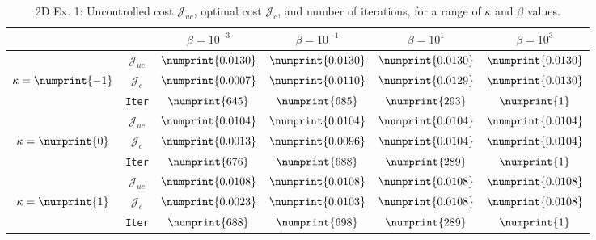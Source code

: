 \begin{table}
\begin{tabular}{ | c | c || c | c | c | c ||}
\hline
\multicolumn{2}{|c||}{}& $\beta = 10^{-3}$ & $\beta = 10^{-1}$ & $\beta = 10^{1}$ & $\beta = 10^{3}$  \\
\hline
\hline
 & $\mathcal{J}_{uc}$ & $\numprint{0.0130}$ & $\numprint{0.0130}$ & $\numprint{0.0130}$ & $\numprint{0.0130}$ \\
$\kappa= \numprint{-1}$  & $\mathcal{J}_c$ & $\numprint{0.0007}$ & $\numprint{0.0110}$ & $\numprint{0.0129}$ & $\numprint{0.0130}$ \\
& \texttt{Iter} & $\numprint{645}$ & $\numprint{685}$ & $\numprint{293}$ & $\numprint{1}$ \\
\hline
 & $\mathcal{J}_{uc}$ & $\numprint{0.0104}$ & $\numprint{0.0104}$ & $\numprint{0.0104}$ & $\numprint{0.0104}$ \\
$\kappa= \numprint{0}$  & $\mathcal{J}_c$ & $\numprint{0.0013}$ & $\numprint{0.0096}$ & $\numprint{0.0104}$ & $\numprint{0.0104}$ \\
& \texttt{Iter} & $\numprint{676}$ & $\numprint{688}$ & $\numprint{289}$ & $\numprint{1}$ \\
\hline
 & $\mathcal{J}_{uc}$ & $\numprint{0.0108}$ & $\numprint{0.0108}$ & $\numprint{0.0108}$ & $\numprint{0.0108}$ \\
$\kappa= \numprint{1}$  & $\mathcal{J}_c$ & $\numprint{0.0023}$ & $\numprint{0.0103}$ & $\numprint{0.0108}$ & $\numprint{0.0108}$ \\
& \texttt{Iter} & $\numprint{688}$ & $\numprint{698}$ & $\numprint{289}$ & $\numprint{1}$ \\
\hline
\end{tabular}
\caption{2D Ex. 1: Uncontrolled cost $\mathcal{J}_{uc}$, optimal cost $\mathcal{J}_{c}$, and number of iterations, for a range of $\kappa$ and $\beta$ values.}
\label{TabS5:Prob12D}
\end{table}